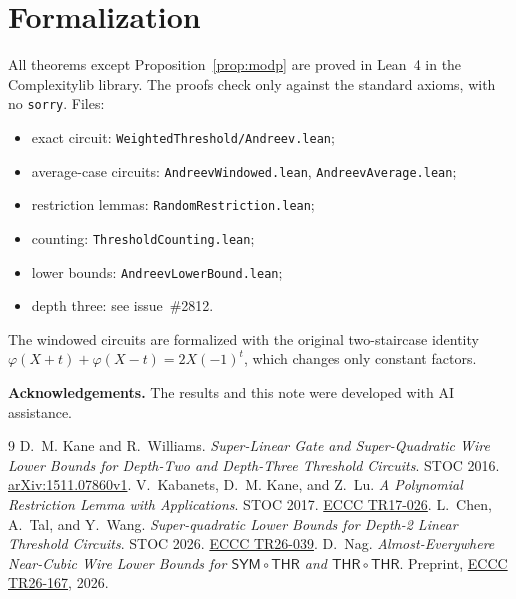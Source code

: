 \documentclass[11pt,letterpaper]{article}
\newcommand{\sect}[1]{\section{\color{ink}#1}}
\newcommand{\smalltitle}[1]{\textbf{\color{ink}#1}\quad}
\newcommand{\THR}{\mathsf{THR}}
\begin{document}
\sect{Formalization}\label{sec:lean}

All theorems except Proposition~\ref{prop:modp} are proved in Lean~4 in
the Complexitylib library. The proofs check only against the standard
axioms, with no \texttt{sorry}. Files:
\begin{itemize}
\item exact circuit: \texttt{WeightedThreshold/Andreev.lean};
\item average-case circuits: \texttt{AndreevWindowed.lean},
      \texttt{AndreevAverage.lean};
\item restriction lemmas: \texttt{RandomRestriction.lean};
\item counting: \texttt{ThresholdCounting.lean};
\item lower bounds: \texttt{AndreevLowerBound.lean};
\item depth three: see issue~\#2812.
\end{itemize}
The windowed circuits are formalized with the original two-staircase identity
$\varphi(X+t)+\varphi(X-t)=2X(-1)^t$, which changes only constant factors.

\smalltitle{Acknowledgements.}
The results and this note were developed with AI assistance.

\renewcommand{\refname}{\color{ink}References}
\begin{thebibliography}{9}\setlength{\itemsep}{0.1em}
 D.~M. Kane and R.~Williams.
\emph{Super-Linear Gate and Super-Quadratic Wire Lower Bounds for Depth-Two
and Depth-Three Threshold Circuits}. STOC 2016.
\href{https://arxiv.org/abs/1511.07860}{arXiv:1511.07860v1}.
 V.~Kabanets, D.~M. Kane, and Z.~Lu.
\emph{A Polynomial Restriction Lemma with Applications}. STOC 2017.
\href{https://eccc.weizmann.ac.il/report/2017/026/}{ECCC TR17-026}.
 L.~Chen, A.~Tal, and Y.~Wang.
\emph{Super-quadratic Lower Bounds for Depth-2 Linear Threshold Circuits}.
STOC 2026. \href{https://eccc.weizmann.ac.il/report/2026/039/}{ECCC TR26-039}.
 D.~Nag. \emph{Almost-Everywhere Near-Cubic Wire Lower Bounds for
$\mathsf{SYM}\circ\THR$ and $\THR\circ\THR$}. Preprint,
\href{https://eccc.weizmann.ac.il/report/2026/167/}{ECCC TR26-167}, 2026.
\end{thebibliography}
\end{document}

